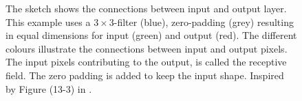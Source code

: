 \begin{figure}[h]
    \caption{The sketch shows the connections between input and output layer. This example uses a $3\times 3$-filter (blue), zero-padding (grey) resulting in equal dimensions for input (green) and output (red). The different colours illustrate the connections between input and output pixels. The input pixels contributing to the output, is called the receptive field. The zero padding is added to keep the input shape. Inspired by Figure (13-3) in . 
    }
    \label{fig:convolution_padding}
\end{figure}
